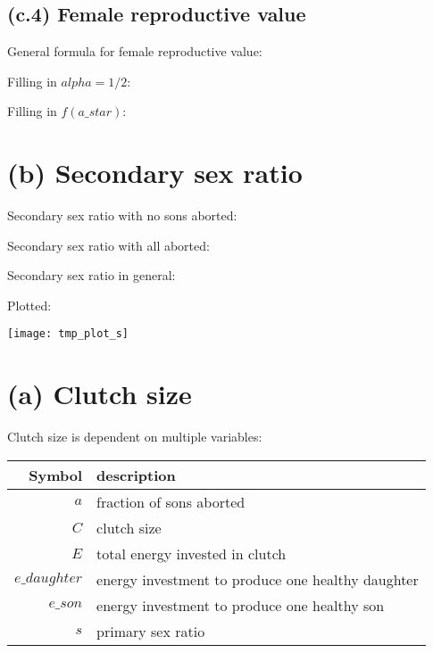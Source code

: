 \documentclass[11]{article}
\begin{document}
\subsection{(c.4) Female reproductive value}

General formula for female reproductive value:



Filling in $alpha=1/2$:



Filling in $f(a\_star)$:















\section{(b) Secondary sex ratio}

Secondary sex ratio with no sons aborted:



Secondary sex ratio with all aborted:



Secondary sex ratio in general:



Plotted:

\texttt{[image: tmp\_plot\_s]}










\section{(a) Clutch size}

Clutch size is dependent on multiple variables:

\bigskip

\begin{tabular}{ | r | l | }
  \hline
  Symbol & description \\ 
  \hline
  $a$ & fraction of sons aborted \\
  $C$ & clutch size \\
  $E$ & total energy invested in clutch \\
  $e\_daughter$ & energy investment to produce one healthy daughter \\
  $e\_son$ & energy investment to produce one healthy son \\
  $s$ & primary sex ratio \\
  \hline
\end{tabular}
\end{document}
